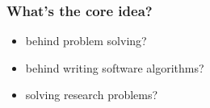 


\begin{frame}[fragile]\frametitle{What's the core idea?}
\begin{itemize}
\item behind problem solving?
\item behind writing software algorithms?
\item solving research problems?
\end{itemize}
\end{frame}

